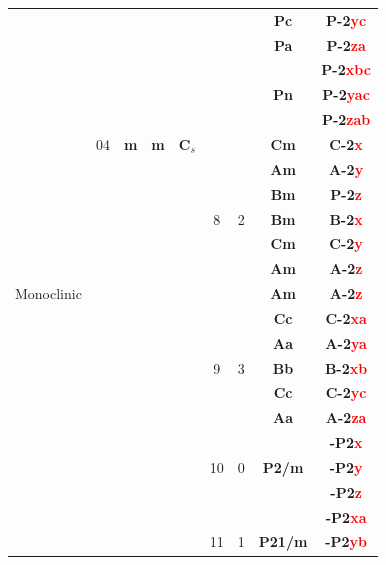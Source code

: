 \documentclass{article}      %
\begin{document}
\begin{small}
\begin{longtable}[c]{|c|c|c|c|c|c|c|c|c|}
 & & & & & & &\textbf{Pc} &\textbf{P-2\textcolor{red}{yc}}  \\\cline{8-9}
 & & & & & & &\textbf{Pa} &\textbf{P-2\textcolor{red}{za}}  \\\cline{8-9}
 & & & & & & & &\textbf{P-2\textcolor{red}{xbc}}  \\\cline{9-9}
 & & & & & & &\textbf{Pn} &\textbf{P-2\textcolor{red}{yac}}  \\\cline{9-9}
 & & & & & & & &\textbf{P-2\textcolor{red}{zab}}  \\\cline{6-9}
 & \textrm{04} &\textbf{m} &\textbf{m} &$\mathbf{C}_s$ & & &\textbf{Cm}&\textbf{C-2\textcolor{red}{x}} \\\cline{9-9}
 & & & & & & &\textbf{Am} &\textbf{A-2\textcolor{red}{y}}  \\\cline{8-9}
 & & & & & & &\textbf{Bm} &\textbf{P-2\textcolor{red}{z}}  \\\cline{8-9}
 & & & & &\textrm{8} &2&\textbf{Bm} &\textbf{B-2\textcolor{red}{x}}  \\\cline{8-9}
 & & & & & & &\textbf{Cm} &\textbf{C-2\textcolor{red}{y}}  \\\cline{8-9}
 & & & & & & &\textbf{Am} &\textbf{A-2\textcolor{red}{z}}  \\\cline{6-9}
\textrm{Monoclinic} & & & & & & &\textbf{Am} &\textbf{A-2\textcolor{red}{z}}  \\\cline{8-9}
 & & & & & & &\textbf{Cc} &\textbf{C-2\textcolor{red}{xa}}  \\\cline{8-9}
 & & & & & & &\textbf{Aa} &\textbf{A-2\textcolor{red}{ya}}  \\\cline{8-9}
 & & & & &\textrm{9} &3&\textbf{Bb} &\textbf{B-2\textcolor{red}{xb}}  \\\cline{8-9}
 & & & & & & &\textbf{Cc} &\textbf{C-2\textcolor{red}{yc}}  \\\cline{8-9}
 & & & & & & &\textbf{Aa} &\textbf{A-2\textcolor{red}{za}}  \\\cline{2-9}
 & & & & & & & &\textbf{-P2\textcolor{red}{x}}  \\\cline{9-9}
 & & & & &\textrm{10} &0 &\textbf{P2/m}&\textbf{-P2\textcolor{red}{y}} \\\cline{9-9}
 & & & & & & & &\textbf{-P2\textcolor{red}{z}}  \\\cline{6-9}
 & & & & & & & &\textbf{-P2\textcolor{red}{xa}}  \\\cline{9-9}
 & & & & &\textrm{11} &1 &\textbf{P21/m}&\textbf{-P2\textcolor{red}{yb}} \\\cline{9-9}

\end{longtable}
\end{small}
\end{document}

